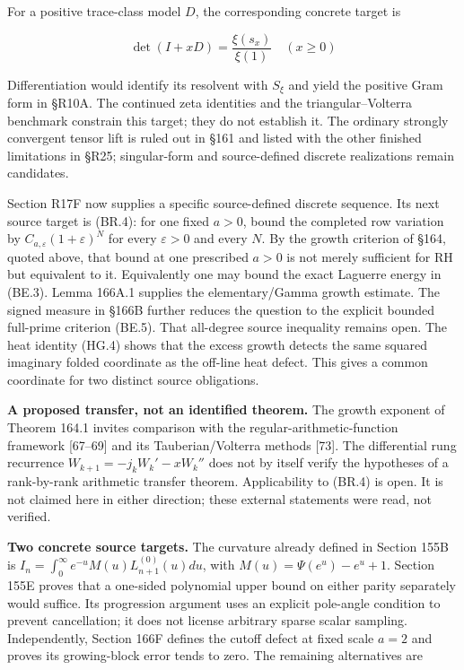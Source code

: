 \documentclass[
  11pt,
]{book}
\begin{document}
For a positive trace-class model \(D\), the corresponding concrete
target is

\[
\boxed{\det(I+xD)=\frac{\xi(s_x)}{\xi(1)}\quad(x\ge0)}
\tag{23.3}
\]

Differentiation would identify its resolvent with \(S_\xi\) and yield
the positive Gram form in §R10A. The continued zeta identities and the
triangular--Volterra benchmark constrain this target; they do not
establish it. The ordinary strongly convergent tensor lift is ruled out
in §161 and listed with the other finished limitations in §R25;
singular-form and source-defined discrete realizations remain
candidates.

Section R17F now supplies a specific source-defined discrete sequence.
Its next source target is (BR.4): for one fixed \(a>0\), bound the
completed row variation by \(C_{a,\varepsilon}(1+\varepsilon)^N\) for
every \(\varepsilon>0\) and every \(N\). By the growth criterion of
§164, quoted above, that bound at one prescribed \(a>0\) is not merely
sufficient for RH but equivalent to it. Equivalently one may bound the
exact Laguerre energy in (BE.3). Lemma 166A.1 supplies the
elementary/Gamma growth estimate. The signed measure in §166B further
reduces the question to the explicit bounded full-prime criterion
(BE.5). That all-degree source inequality remains open. The heat
identity (HG.4) shows that the excess growth detects the same squared
imaginary folded coordinate as the off-line heat defect. This gives a
common coordinate for two distinct source obligations.

\textbf{A proposed transfer, not an identified theorem.} The growth
exponent of Theorem 164.1 invites comparison with the
regular-arithmetic-function framework {[}67--69{]} and its
Tauberian/Volterra methods {[}73{]}. The differential rung recurrence
\(W_{k+1}=-j_kW_k'-xW_k''\) does not by itself verify the hypotheses of
a rank-by-rank arithmetic transfer theorem. Applicability to (BR.4) is
open. It is not claimed here in either direction; these external
statements were read, not verified.

\textbf{Two concrete source targets.} The curvature already defined in
Section 155B is \(I_n=\int_0^\infty e^{-u}M(u)L_{n+1}^{(0)}(u)du\), with
\(M(u)=\Psi(e^u)-e^u+1\). Section 155E proves that a one-sided
polynomial upper bound on either parity separately would suffice. Its
progression argument uses an explicit pole-angle condition to prevent
cancellation; it does not license arbitrary sparse scalar sampling.
Independently, Section 166F defines the cutoff defect at fixed scale
\(a=2\) and proves its growing-block error tends to zero. The remaining
alternatives are
\end{document}
